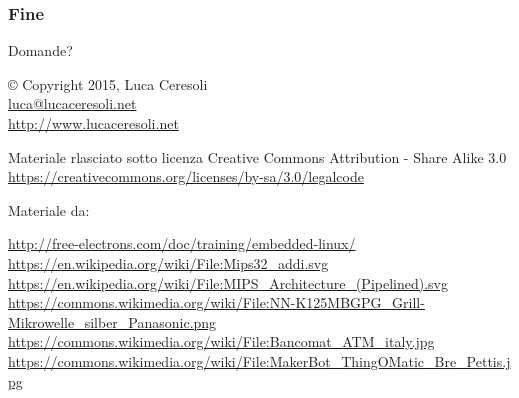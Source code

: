 \documentclass[xetex,table]{beamer}
\begin{document}
\begin{frame}
\frametitle{Fine}

  \begin{center}
    {\Huge Domande?}

    \vspace{0.1\textheight}

    © Copyright 2015, Luca Ceresoli\\
    \href{mailto:luca@lucaceresoli.net}{luca@lucaceresoli.net}\\
    \url{http://www.lucaceresoli.net}

  \vspace{0.05\textheight}

   \tiny
   Materiale rlasciato sotto
   licenza Creative Commons Attribution - Share Alike 3.0 \\
   \url{https://creativecommons.org/licenses/by-sa/3.0/legalcode} \\
  \end{center}

  \vspace{0.05\textheight}

  Materiale da:

  \vspace{0.01\textheight}
  \begin{tiny}
    {
      \setlength{\parskip}{0cm plus0mm minus3mm}
      \fontsize{4}{0}
      \url{http://free-electrons.com/doc/training/embedded-linux/}\\
      \url{https://en.wikipedia.org/wiki/File:Mips32_addi.svg}\\
      \url{https://en.wikipedia.org/wiki/File:MIPS_Architecture_(Pipelined).svg}\\
      \url{https://commons.wikimedia.org/wiki/File:NN-K125MBGPG_Grill-Mikrowelle_silber_Panasonic.png}\\
      \url{https://commons.wikimedia.org/wiki/File:Bancomat_ATM_italy.jpg}\\
      \url{https://commons.wikimedia.org/wiki/File:MakerBot_ThingOMatic_Bre_Pettis.jpg}\\
    }
  \end{tiny}
\end{frame}
\end{document}
